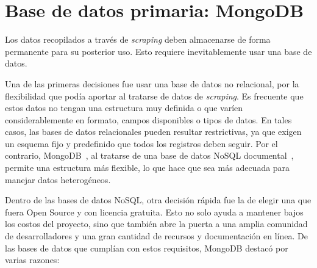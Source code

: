 \clearpage
\section{Base de datos primaria: MongoDB}\label{sec:mongodb_section}

Los datos recopilados a través de \textit{scraping} deben almacenarse de forma permanente para su posterior uso. Esto requiere inevitablemente usar una base de datos.

Una de las primeras decisiones fue usar una base de datos no relacional, por la flexibilidad que podía aportar al tratarse de datos de \textit{scraping}. Es frecuente que estos datos no tengan una estructura muy definida o que varíen considerablemente en formato, campos disponibles o tipos de datos. En tales casos, las bases de datos relacionales pueden resultar restrictivas, ya que exigen un esquema fijo y predefinido que todos los registros deben seguir. Por el contrario, MongoDB~\cite{mongodb}, al tratarse de una base de datos NoSQL documental~\cite{chauhan2019}, permite una estructura más flexible, lo que hace que sea más adecuada para manejar datos heterogéneos.

Dentro de las bases de datos NoSQL, otra decisión rápida fue la de elegir una que fuera Open Source y con licencia gratuita. Esto no solo ayuda a mantener bajos los costos del proyecto, sino que también abre la puerta a una amplia comunidad de desarrolladores y una gran cantidad de recursos y documentación en línea. De las bases de datos que cumplían con estos requisitos, MongoDB destacó por varias razones:

